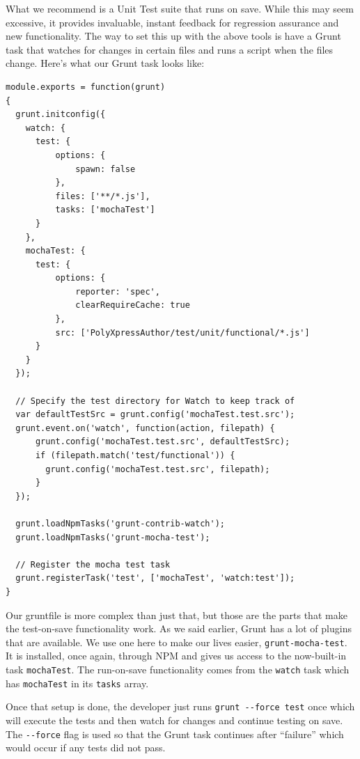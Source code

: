 \documentclass[12pt]{ucthesis}
\begin{document}
What we recommend is a Unit Test suite that runs on save. While this may seem excessive, it provides invaluable, instant feedback for regression assurance and new functionality. The way to set this up with the above tools is have a Grunt task that watches for changes in certain files and runs a script when the files change. Here's what our Grunt task looks like:
\begin{lstlisting}
module.exports = function(grunt)
{
  grunt.initconfig({
    watch: {
      test: {
          options: {
              spawn: false
          },
          files: ['**/*.js'],
          tasks: ['mochaTest']
      }
    },
    mochaTest: {
      test: {
          options: {
              reporter: 'spec',
              clearRequireCache: true
          },
          src: ['PolyXpressAuthor/test/unit/functional/*.js']
      }
    }
  });

  // Specify the test directory for Watch to keep track of
  var defaultTestSrc = grunt.config('mochaTest.test.src');
  grunt.event.on('watch', function(action, filepath) {
      grunt.config('mochaTest.test.src', defaultTestSrc);
      if (filepath.match('test/functional')) {
        grunt.config('mochaTest.test.src', filepath);
      }
  });

  grunt.loadNpmTasks('grunt-contrib-watch');
  grunt.loadNpmTasks('grunt-mocha-test');

  // Register the mocha test task
  grunt.registerTask('test', ['mochaTest', 'watch:test']);
}
\end{lstlisting}

Our gruntfile is more complex than just that, but those are the parts that make the test-on-save functionality work. As we said earlier, Grunt has a lot of plugins that are available. We use one here to make our lives easier, \lstinline{grunt-mocha-test}. It is installed, once again, through NPM and gives us access to the now-built-in task \lstinline{mochaTest}. The run-on-save functionality comes from the \lstinline{watch} task which has \lstinline{mochaTest} in its \lstinline{tasks} array.

Once that setup is done, the developer just runs \lstinline{grunt --force test} once which will execute the tests and then watch for changes and continue testing on save. The \lstinline{--force} flag is used so that the Grunt task continues after ``failure'' which would occur if any tests did not pass.
\end{document}
